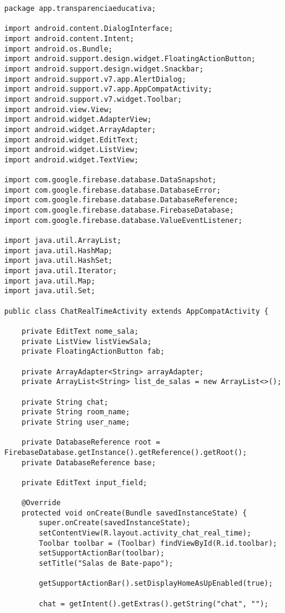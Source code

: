 \documentclass[12pt,a4paper]{article}
\begin{document}
\begin{lstlisting}[caption=./mobile/src/main/java/app/transparenciaeducativa/ChatRealTimeActivity.java]
package app.transparenciaeducativa;

import android.content.DialogInterface;
import android.content.Intent;
import android.os.Bundle;
import android.support.design.widget.FloatingActionButton;
import android.support.design.widget.Snackbar;
import android.support.v7.app.AlertDialog;
import android.support.v7.app.AppCompatActivity;
import android.support.v7.widget.Toolbar;
import android.view.View;
import android.widget.AdapterView;
import android.widget.ArrayAdapter;
import android.widget.EditText;
import android.widget.ListView;
import android.widget.TextView;

import com.google.firebase.database.DataSnapshot;
import com.google.firebase.database.DatabaseError;
import com.google.firebase.database.DatabaseReference;
import com.google.firebase.database.FirebaseDatabase;
import com.google.firebase.database.ValueEventListener;

import java.util.ArrayList;
import java.util.HashMap;
import java.util.HashSet;
import java.util.Iterator;
import java.util.Map;
import java.util.Set;

public class ChatRealTimeActivity extends AppCompatActivity {

    private EditText nome_sala;
    private ListView listViewSala;
    private FloatingActionButton fab;

    private ArrayAdapter<String> arrayAdapter;
    private ArrayList<String> list_de_salas = new ArrayList<>();

    private String chat;
    private String room_name;
    private String user_name;

    private DatabaseReference root = FirebaseDatabase.getInstance().getReference().getRoot();
    private DatabaseReference base;

    private EditText input_field;

    @Override
    protected void onCreate(Bundle savedInstanceState) {
        super.onCreate(savedInstanceState);
        setContentView(R.layout.activity_chat_real_time);
        Toolbar toolbar = (Toolbar) findViewById(R.id.toolbar);
        setSupportActionBar(toolbar);
        setTitle("Salas de Bate-papo");

        getSupportActionBar().setDisplayHomeAsUpEnabled(true);

        chat = getIntent().getExtras().getString("chat", "");


\end{lstlisting}
\end{document}
